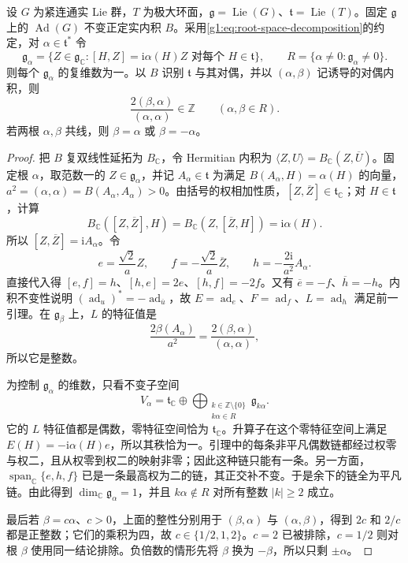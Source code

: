 \begin{theorem}\label{g1:thm:compact-root-spaces}
	设 \(G\) 为紧连通实 Lie 群，\(T\) 为极大环面，\(\mathfrak g=\operatorname{Lie}(G)\)、\(\mathfrak t=\operatorname{Lie}(T)\)。固定 \(\mathfrak g\) 上的 \(\operatorname{Ad}(G)\) 不变正定实内积 \(B\)。采用\eqref{g1:eq:root-space-decomposition}的约定，对 \(\alpha\in\mathfrak t^*\) 令
	\[
		\mathfrak g_\alpha=\{Z\in\mathfrak g_{\mathbb C}:[H,Z]=\mathrm{i}\alpha(H)Z\text{ 对每个 }H\in\mathfrak t\},
		\qquad R=\{\alpha\ne0:\mathfrak g_\alpha\ne0\}.
	\]
	则每个 \(\mathfrak g_\alpha\) 的复维数为一。以 \(B\) 识别 \(\mathfrak t\) 与其对偶，并以 \((\alpha,\beta)\) 记诱导的对偶内积，则
	\[
		\frac{2(\beta,\alpha)}{(\alpha,\alpha)}\in\mathbb Z
		\qquad(\alpha,\beta\in R).
	\]
	若两根 \(\alpha,\beta\) 共线，则 \(\beta=\alpha\) 或 \(\beta=-\alpha\)。
\end{theorem}
\begin{proof}
	把 \(B\) 复双线性延拓为 \(B_{\mathbb C}\)，令 Hermitian 内积为 \(\langle Z,U\rangle=B_{\mathbb C}(Z,\overline U)\)。固定根 \(\alpha\)，取范数一的 \(Z\in\mathfrak g_\alpha\)，并记 \(A_\alpha\in\mathfrak t\) 为满足 \(B(A_\alpha,H)=\alpha(H)\) 的向量，\(a^2=(\alpha,\alpha)=B(A_\alpha,A_\alpha)>0\)。由括号的权相加性质，\([Z,\overline Z]\in\mathfrak t_{\mathbb C}\)；对 \(H\in\mathfrak t\)，计算
	\[
		B_{\mathbb C}([Z,\overline Z],H)
		=B_{\mathbb C}(Z,[\overline Z,H])
		=\mathrm{i}\alpha(H).
	\]
	所以 \([Z,\overline Z]=\mathrm{i}A_\alpha\)。令
	\begin{equation}\label{g1:eq:root-sl2-triple}
		e=\frac{\sqrt2}{a}Z,\qquad
		f=-\frac{\sqrt2}{a}\overline Z,\qquad
		h=-\frac{2\mathrm{i}}{a^2}A_\alpha.
	\end{equation}
	直接代入得 \([e,f]=h\)、\([h,e]=2e\)、\([h,f]=-2f\)。又有 \(\overline e=-f\)、\(\overline h=-h\)。内积不变性说明 \((\operatorname{ad}_u)^*=-\operatorname{ad}_{\overline u}\)，故 \(E=\operatorname{ad}_e\)、\(F=\operatorname{ad}_f\)、\(L=\operatorname{ad}_h\) 满足前一引理。在 \(\mathfrak g_\beta\) 上，\(L\) 的特征值是
	\[
		\frac{2\beta(A_\alpha)}{a^2}
		=\frac{2(\beta,\alpha)}{(\alpha,\alpha)},
	\]
	所以它是整数。

	为控制 \(\mathfrak g_\alpha\) 的维数，只看不变子空间
	\[
		V_\alpha=\mathfrak t_{\mathbb C}\oplus
		\bigoplus_{\substack{k\in\mathbb Z\setminus\{0\}\\k\alpha\in R}}
		\mathfrak g_{k\alpha}.
	\]
	它的 \(L\) 特征值都是偶数，零特征空间恰为 \(\mathfrak t_{\mathbb C}\)。升算子在这个零特征空间上满足 \(E(H)=-\mathrm{i}\alpha(H)e\)，所以其秩恰为一。引理中的每条非平凡偶数链都经过权零与权二，且从权零到权二的映射非零；因此这种链只能有一条。另一方面，\(\operatorname{span}_{\mathbb C}\{e,h,f\}\) 已是一条最高权为二的链，其正交补不变。于是余下的链全为平凡链。由此得到 \(\dim_{\mathbb C}\mathfrak g_\alpha=1\)，并且 \(k\alpha\notin R\) 对所有整数 \(|k|\ge2\) 成立。

	最后若 \(\beta=c\alpha\)、\(c>0\)，上面的整性分别用于 \((\beta,\alpha)\) 与 \((\alpha,\beta)\)，得到 \(2c\) 和 \(2/c\) 都是正整数；它们的乘积为四，故 \(c\in\{1/2,1,2\}\)。\(c=2\) 已被排除，\(c=1/2\) 则对根 \(\beta\) 使用同一结论排除。负倍数的情形先将 \(\beta\) 换为 \(-\beta\)，所以只剩 \(\pm\alpha\)。
\end{proof}

